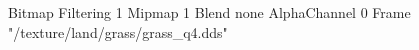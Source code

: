 {Bitmap
	{Filtering 1}
	{Mipmap 1}
	{Blend none}
	{AlphaChannel 0}
	{Frame "/texture/land/grass/grass_q4.dds"}
}
